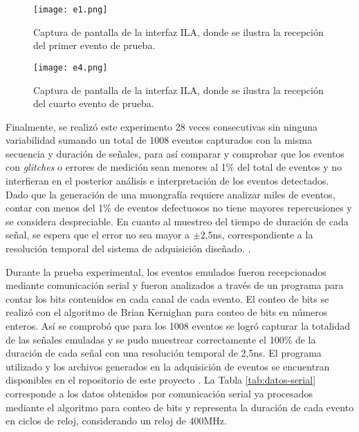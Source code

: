 	\begin{figure}[ht]
		\centering
		\texttt{[image: e1.png]}
		\caption{Captura de pantalla de la interfaz ILA, donde se ilustra la recepción del primer evento de prueba.}
		\label{img:e1}
	\end{figure}
	
	
	\begin{figure}[ht]
		\centering
		\texttt{[image: e4.png]}
		\caption{Captura de pantalla de la interfaz ILA, donde se ilustra la recepción del cuarto evento de prueba.}
		\label{img:e4}
	\end{figure}

	Finalmente, se realizó este experimento 28 veces consecutivas sin ninguna variabilidad sumando un total de 1008 eventos capturados con la misma secuencia y duración de señales, para así comparar y comprobar que los eventos con \textit{glitches} o errores de medición sean menores al 1\% del total de eventos y no interfieran en el posterior análisis e interpretación de los eventos detectados. Dado que la generación de una muongrafía requiere analizar miles de eventos, contar con menos del 1\% de eventos defectuosos no tiene mayores repercusiones y se considera despreciable. En cuanto al muestreo del tiempo de duración de cada señal, se espera que el error no sea mayor a $\pm$2,5ns, correspondiente a la resolución temporal del sistema de adquisición diseñado. . 
	
	Durante la prueba experimental, los eventos emulados fueron recepcionados mediante comunicación serial y fueron analizados a través de un programa para contar los bits contenidos en cada canal de cada evento. El conteo de bits se realizó con el algoritmo de Brian Kernighan\cite{SinghCountC++} para conteo de bits en números enteros. Así se comprobó que para los 1008 eventos se logró capturar la totalidad de las señales emuladas y se pudo muestrear correctamente el 100\% de la duración de cada señal con una resolución temporal de 2,5ns. El programa utilizado y los archivos generados en la adquisición de eventos se encuentran disponibles en el repositorio de este proyecto \cite{GonzalezMuonRepository}. La Tabla \ref{tab:datos-serial} corresponde a los datos obtenidos por comunicación serial ya procesados mediante el algoritmo para conteo de bits y representa la duración de cada evento en ciclos de reloj, considerando un reloj de 400MHz.	
	
